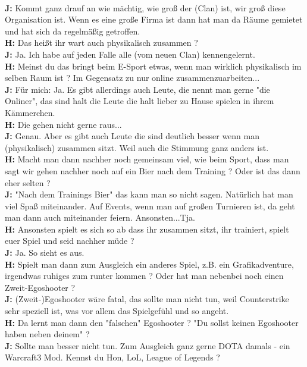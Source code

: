 \documentclass[10pt,a4paper,ngerman,twoside]{article} %
\begin{document}
\\ \textbf{J:} Kommt ganz drauf an wie mächtig, wie groß der (Clan) ist, wir groß diese Organisation ist. Wenn es eine große Firma ist dann hat man da  Räume gemietet und hat sich da regelmäßig getroffen.
\\ \textbf{H:} Das heißt ihr wart auch physikalisch zusammen ?
\\ \textbf{J:} Ja. Ich habe auf jeden Falle alle (vom neuen Clan) kennengelernt.
\\ \textbf{H:} Meinst du das bringt beim E-Sport etwas, wenn man wirklich physikalisch im selben Raum ist ? Im Gegensatz zu nur online zusammenzuarbeiten...
\\ \textbf{J:} Für mich: Ja. Es gibt allerdings auch Leute, die nennt man gerne "die Onliner", das sind halt die Leute die halt lieber zu Hause spielen in ihrem Kämmerchen.
\\ \textbf{H:} Die gehen nicht gerne raus...
\\ \textbf{J:} Genau. Aber es gibt auch Leute die sind deutlich besser wenn man (physikalisch) zusammen sitzt. Weil auch die Stimmung ganz anders ist.
\\ \textbf{H:} Macht man dann nachher noch gemeinsam viel, wie beim Sport, dass man sagt wir gehen nachher noch auf ein Bier nach dem Training ? Oder ist das dann eher selten ?
\\ \textbf{J:} "Nach dem Trainings Bier" das kann man so nicht sagen. Natürlich hat man viel Spaß miteinander. Auf Events, wenn man auf großen Turnieren ist, da geht man dann auch miteinander feiern. Ansonsten...Tja.
\\ \textbf{H:} Ansonsten spielt es sich so ab dass ihr zusammen sitzt, ihr trainiert, spielt euer Spiel und seid nachher müde ?
\\ \textbf{J:} Ja. So sieht es aus.
\\ \textbf{H:} Spielt man dann zum Ausgleich ein anderes Spiel, z.B. ein Grafikadventure, irgendwas ruhiges zum runter kommen ? Oder hat man nebenbei noch einen Zweit-Egoshooter ?
\\ \textbf{J:} (Zweit-)Egoshooter wäre fatal, das sollte man nicht tun, weil Counterstrike sehr speziell ist, was vor allem das Spielgefühl und so angeht.
\\ \textbf{H:} Da lernt man dann den "falschen" Egoshooter ? "Du sollst keinen Egoshooter haben neben deinem" ?
\\ \textbf{J:} Sollte man besser nicht tun. Zum Ausgleich ganz gerne DOTA damals - ein Warcraft3 Mod. Kennst du Hon, LoL, League of Legends ?
\end{document}
